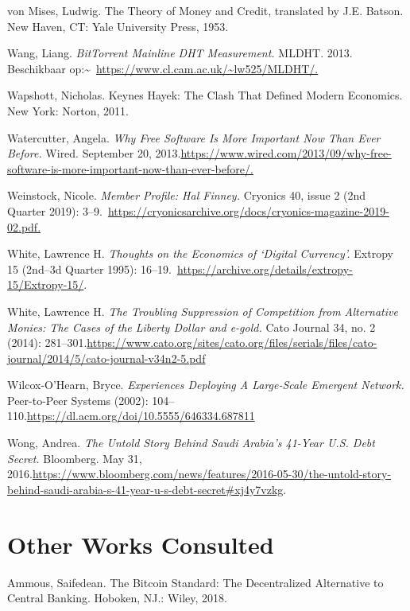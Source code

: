\documentclass[smalldemyvopaper,11pt,twoside,onecolumn,openright,extrafontsizes,hidelinks]{memoir}
\begin{document}
von Mises, Ludwig. The Theory of Money and Credit, translated by J.E.
Batson. New Haven, CT: Yale University Press, 1953.

Wang, Liang. \emph{BitTorrent Mainline DHT Measurement.} MLDHT. 2013.
Beschikbaar
op:\textasciitilde~\href{https://www.cl.cam.ac.uk/~lw525/MLDHT/}{https://www.cl.cam.ac.uk/\textasciitilde lw525/MLDHT/.}

Wapshott, Nicholas. Keynes Hayek: The Clash That Defined Modern
Economics. New York: Norton, 2011.

Watercutter, Angela. \emph{Why Free Software Is More Important Now Than
Ever Before.} Wired. September 20,
2013.\href{https://www.wired.com/2013/09/why-free-software-is-more-important-now-than-ever-before/}{https://www.wired.com/2013/09/why-free-software-is-more-important-now-than-ever-before/.}

Weinstock, Nicole. \emph{Member Profile: Hal Finney.} Cryonics 40, issue
2 (2nd Quarter 2019):
3--9.~\href{https://cryonicsarchive.org/docs/cryonics-magazine-2019-02.pdf}{https://cryonicsarchive.org/docs/cryonics-magazine-2019-02.pdf.}

White, Lawrence H. \emph{Thoughts on the Economics of `Digital
Currency'.} Extropy 15 (2nd--3d Quarter 1995):
16--19.~\url{https://archive.org/details/extropy-15/Extropy-15/}.

White, Lawrence H. \emph{The Troubling Suppression of Competition from
Alternative Monies: The Cases of the Liberty Dollar and e-gold.} Cato
Journal 34, no. 2 (2014):
281--301.\url{https://www.cato.org/sites/cato.org/files/serials/files/cato-journal/2014/5/cato-journal-v34n2-5.pdf}

Wilcox-O'Hearn, Bryce. \emph{Experiences Deploying A Large-Scale
Emergent Network.} Peer-to-Peer Systems (2002):
104--110.\url{https://dl.acm.org/doi/10.5555/646334.687811}

Wong, Andrea. \emph{The Untold Story Behind Saudi Arabia's 41-Year U.S.
Debt Secret.} Bloomberg. May 31,
2016.\url{https://www.bloomberg.com/news/features/2016-05-30/the-untold-story-behind-saudi-arabia-s-41-year-u-s-debt-secret\#xj4y7vzkg}.

\section*{Other Works Consulted}\label{other-works-consulted}


Ammous, Saifedean. The Bitcoin Standard: The Decentralized Alternative
to Central Banking. Hoboken, NJ.: Wiley, 2018.
\end{document}
